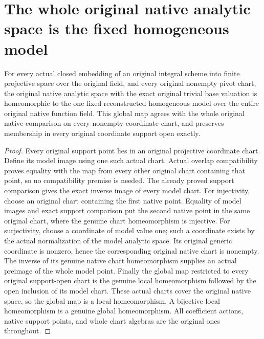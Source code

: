 \section{The whole original native analytic space is the fixed homogeneous model}
\label{sec:projective-fixed-native-analytic-gluing}

\begin{theorem}
\label{thm:projective-fixed-native-analytic-gluing}
\leanok
{}
For every actual closed embedding of an original integral scheme into finite
projective space over the original field, and every original nonempty pivot
chart, the original native analytic space with the exact original trivial
base valuation is homeomorphic to the one fixed reconstructed homogeneous
model over the entire original native function field. This global map agrees
with the whole original native comparison on every nonempty coordinate chart,
and preserves membership in every original coordinate support open exactly.
\end{theorem}
\begin{proof}
Every original support point lies in an original projective coordinate chart.
Define its model image using one such actual chart. Actual overlap
compatibility proves equality with the map from every other original chart
containing that point, so no compatibility premise is needed. The already
proved support comparison gives the exact inverse image of every model chart.
For injectivity, choose an original chart containing the first native point.
Equality of model images and exact support comparison put the second native
point in the same original chart, where the genuine chart homeomorphism is
injective. For surjectivity, choose a coordinate of model value one; such a
coordinate exists by the actual normalization of the model analytic space.
Its original generic coordinate is nonzero, hence the corresponding original
native chart is nonempty. The inverse of its genuine native chart
homeomorphism supplies an actual preimage of the whole model point.
Finally the global map restricted to every original support-open chart is
the genuine local homeomorphism followed by the open inclusion of its model
chart. These actual charts cover the original native space, so the global
map is a local homeomorphism. A bijective local homeomorphism is a genuine
global homeomorphism. All coefficient actions, native support points, and
whole chart algebras are the original ones throughout.
\end{proof}
